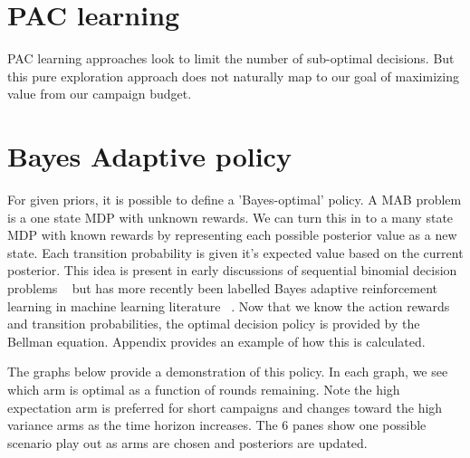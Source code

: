 \documentclass[11pt,a4,singlespacing,titlepagenumber=on]{scrreprt}
\numberwithin{equation}{chapter} %
\theoremstyle{remark}
\begin{document}
\section{PAC learning}

PAC learning approaches look to limit the number of sub-optimal decisions. But this pure exploration approach does not naturally map to our goal of maximizing value from our campaign budget.

\section{ Bayes Adaptive policy }

For given priors, it is possible to define a 'Bayes-optimal' policy. A MAB problem is a one state MDP with unknown rewards. We can turn this in to a many state MDP with known rewards by representing each possible posterior value as a new state. Each transition probability is given it's expected value based on the current posterior. This idea is present in early discussions of sequential binomial decision problems ~\cite{chernoff1965bayes} but has more recently been labelled Bayes adaptive reinforcement learning in machine learning literature ~\cite{duff2002optimal}. Now that we know the action rewards and transition probabilities, the optimal decision policy is provided by the Bellman equation. Appendix provides an example of how this is calculated.

The graphs below provide a demonstration of this policy. In each graph, we see which arm is optimal as a function of rounds remaining. Note the high expectation arm is preferred for short campaigns and changes toward the high variance arms as the time horizon increases. The 6 panes show one possible scenario play out as arms are chosen and posteriors are updated.
\end{document}
